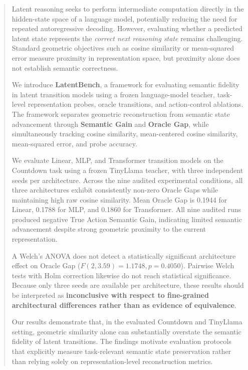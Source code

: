 \documentclass[conference]{IEEEtran}
\begin{document}
\begin{abstract}
Latent reasoning seeks to perform intermediate computation directly in the hidden-state space of a language model, potentially reducing the need for repeated autoregressive decoding. However, evaluating whether a predicted latent state represents the \textit{correct next reasoning state} remains challenging. Standard geometric objectives such as cosine similarity or mean-squared error measure proximity in representation space, but proximity alone does not establish semantic correctness.

We introduce \textbf{LatentBench}, a framework for evaluating semantic fidelity in latent transition models using a frozen language-model teacher, task-level representation probes, oracle transitions, and action-control ablations. The framework separates geometric reconstruction from semantic state advancement through \textbf{Semantic Gain} and \textbf{Oracle Gap}, while simultaneously tracking cosine similarity, mean-centered cosine similarity, mean-squared error, and probe accuracy.

We evaluate Linear, MLP, and Transformer transition models on the Countdown task using a frozen TinyLlama teacher, with three independent seeds per architecture. Across the nine audited experimental conditions, all three architectures exhibit consistently non-zero Oracle Gaps while maintaining high raw cosine similarity. Mean Oracle Gap is 0.1944 for Linear, 0.1788 for MLP, and 0.1860 for Transformer. All nine audited runs produced negative True Action Semantic Gain, indicating limited semantic advancement despite strong geometric proximity to the current representation.

A Welch's ANOVA does not detect a statistically significant architecture effect on Oracle Gap ($F(2,3.59)=1.1748, p=0.4050$). Pairwise Welch tests with Holm correction likewise do not reach statistical significance. Because only three seeds are available per architecture, these results should be interpreted as \textbf{inconclusive with respect to fine-grained architectural differences rather than as evidence of equivalence}.

Our results demonstrate that, in the evaluated Countdown and TinyLlama setting, geometric similarity alone can substantially overstate the semantic fidelity of latent transitions. The findings motivate evaluation protocols that explicitly measure task-relevant semantic state preservation rather than relying solely on representation-level reconstruction metrics.
\end{abstract}
\end{document}
